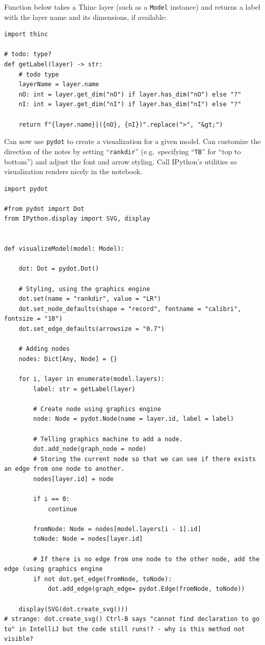 \documentclass[
]{article}
\begin{document}
Function below takes a Thinc layer (such as a
\texttt{Model} instance) and returns a label with the
layer name and its dimensions, if available:

\begin{verbatim}
import thinc

# todo: type?
def getLabel(layer) -> str:
    # todo type
    layerName = layer.name
    nO: int = layer.get_dim("nO") if layer.has_dim("nO") else "?"
    nI: int = layer.get_dim("nI") if layer.has_dim("nI") else "?"

    return f"{layer.name}|({nO}, {nI})".replace(">", "&gt;")
\end{verbatim}

Can now use \texttt{pydot} to create a visualization for a
given model. Can customize the direction of the notes by setting
``\texttt{rankdir}'' (e.g.~specifying
``\texttt{TB}'' for ``top to bottom'') and adjust the font
and arrow styling. Call IPython's utilities so visualization renders
nicely in the notebook.

\begin{verbatim}
import pydot

#from pydot import Dot
from IPython.display import SVG, display


def visualizeModel(model: Model):

    dot: Dot = pydot.Dot()

    # Styling, using the graphics engine
    dot.set(name = "rankdir", value = "LR")
    dot.set_node_defaults(shape = "record", fontname = "calibri", fontsize = "10")
    dot.set_edge_defaults(arrowsize = "0.7")

    # Adding nodes
    nodes: Dict[Any, Node] = {}

    for i, layer in enumerate(model.layers):
        label: str = getLabel(layer)

        # Create node using graphics engine
        node: Node = pydot.Node(name = layer.id, label = label)

        # Telling graphics machine to add a node.
        dot.add_node(graph_node = node)
        # Storing the current node so that we can see if there exists an edge from one node to another.
        nodes[layer.id] = node

        if i == 0:
            continue

        fromNode: Node = nodes[model.layers[i - 1].id]
        toNode: Node = nodes[layer.id]

        # If there is no edge from one node to the other node, add the edge (using graphics engine
        if not dot.get_edge(fromNode, toNode):
            dot.add_edge(graph_edge= pydot.Edge(fromNode, toNode))

    display(SVG(dot.create_svg()))
# strange: dot.create_svg() Ctrl-B says "cannot find declaration to go to" in IntelliJ but the code still runs!? - why is this method not visible?
\end{verbatim}
\end{document}
